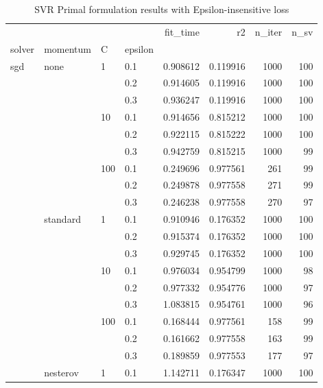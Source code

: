 \begin{table}[H]
\centering
\caption{SVR Primal formulation results with Epsilon-insensitive loss}
\label{primal_l1_svr_cv_results}
\begin{tabular}{llllrrrr}
\toprule
          &   &     &     &  fit\_time &        r2 &  n\_iter &  n\_sv \\
solver & momentum & C & epsilon &           &           &         &       \\
\midrule
sgd & none & 1   & 0.1 &  0.908612 &  0.119916 &    1000 &   100 \\
          &   &     & 0.2 &  0.914605 &  0.119916 &    1000 &   100 \\
          &   &     & 0.3 &  0.936247 &  0.119916 &    1000 &   100 \\
          &   & 10  & 0.1 &  0.914656 &  0.815212 &    1000 &   100 \\
          &   &     & 0.2 &  0.922115 &  0.815222 &    1000 &   100 \\
          &   &     & 0.3 &  0.942759 &  0.815215 &    1000 &    99 \\
          &   & 100 & 0.1 &  0.249696 &  0.977561 &     261 &    99 \\
          &   &     & 0.2 &  0.249878 &  0.977558 &     271 &    99 \\
          &   &     & 0.3 &  0.246238 &  0.977558 &     270 &    97 \\
          & standard & 1   & 0.1 &  0.910946 &  0.176352 &    1000 &   100 \\
          &   &     & 0.2 &  0.915374 &  0.176352 &    1000 &   100 \\
          &   &     & 0.3 &  0.929745 &  0.176352 &    1000 &   100 \\
          &   & 10  & 0.1 &  0.976034 &  0.954799 &    1000 &    98 \\
          &   &     & 0.2 &  0.977332 &  0.954776 &    1000 &    97 \\
          &   &     & 0.3 &  1.083815 &  0.954761 &    1000 &    96 \\
          &   & 100 & 0.1 &  0.168444 &  0.977561 &     158 &    99 \\
          &   &     & 0.2 &  0.161662 &  0.977558 &     163 &    99 \\
          &   &     & 0.3 &  0.189859 &  0.977553 &     177 &    97 \\
          & nesterov & 1   & 0.1 &  1.142711 &  0.176347 &    1000 &   100 \\

\end{tabular}
\end{table}
